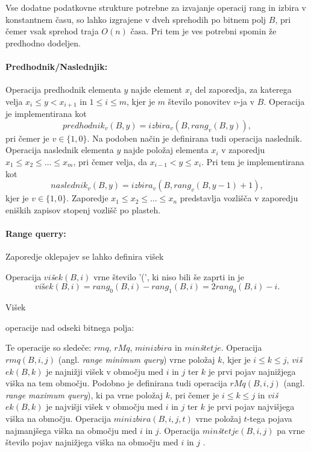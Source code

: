 Vse dodatne podatkovne strukture potrebne za izvajanje operacij rang in izbira v konstantnem času, so lahko izgrajene v dveh sprehodih po bitnem polj $B$, pri čemer vsak sprehod traja $O(n)$ časa. Pri tem je ves potrebni spomin že predhodno dodeljen.

\paragraph{Predhodnik/Naslednjik:}

Operacija predhodnik elementa $y$ najde element $x_i$ del zaporedja, za katerega velja $x_i \le y < x_{i+1}$ in $1\le i\le m$, kjer je $m$ število ponovitev $v$-ja v $B$. Operacija je implementirana kot
    $$predhodnik_v(B,y)=izbira_v(B,rang_v(B,y)),$$
pri čemer je $v\in \{1,0\}$. Na podoben način je definirana tudi operacija naslednik. Operacija naslednik elementa $y$  najde položaj elementa $x_i$ v zaporedju $x_1\le x_2 \le \dots \le x_m$, pri čemer velja, da $x_{i-1}< y \le x_i$. Pri tem je implementirana kot
    $$naslednik_v(B,y)=izbira_v(B,rang_v(B,y-1)+1),$$
kjer je  $v\in \{1,0\}$. Zaporedje $x_1\le x_2 \le \dots \le x_n$ predstavlja vozlišča v zaporedju eniških zapisov stopenj vozlišč po plasteh.

\paragraph{Range querry:}

Zaporedje oklepajev se lahko definira višek

Operacija $vi$\textit{š}$ek(B,i)$ vrne število '(', ki niso bili še zaprti in je
$$
    \textit{višek}(B,i)=rang_0(B,i)-rang_1(B,i)=2rang_0(B,i)-i.
$$

Višek

operacije nad odseki bitnega polja:

Te operacije so sledeče: $rmq$, $rMq$, $minizbira$ in $min$\textit{š}$tetje$. Operacija $rmq(B,i,j)$ (angl. \textit{range minimum query}) vrne položaj $k$, kjer je $i\le k\le j$, $vi$\textit{š}$ek(B,k)$ je najnižji višek v območju med $i$ in $j$ ter $k$ je prvi pojav najnižjega viška na tem območju. Podobno je definirana tudi operacija $rMq(B,i,j)$ (angl. \textit{range maximum query}), ki pa vrne položaj $k$, pri čemer je $i\le k\le j$ in $vi$\textit{š}$ek(B,k)$ je najvišji višek v območju med $i$ in $j$ ter $k$ je prvi pojav najvišjega viška na območju. Operacija $minizbira(B,i,j,t)$ vrne položaj $t$-tega pojava najmanjšega viška na območju med $i$ in $j$. Operacija $min$\textit{š}$tetje(B,i,j)$ pa vrne število pojav najnižjega viška na območju med $i$ in $j$ \cite{Navarro2016}.


